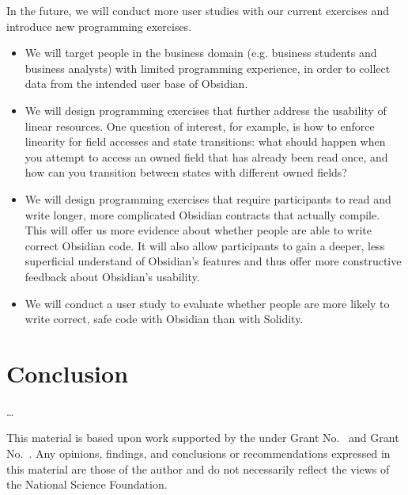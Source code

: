 \documentclass[sigplan,10pt,review]{acmart}\settopmatter{printfolios=true}
\begin{document}
In the future, we will conduct more user studies with our current exercises and introduce new programming
exercises.
\begin{itemize}
\item We will target people in the business domain (e.g. business students and business analysts) with limited
programming experience, in order to collect data from the intended user base of Obsidian.
\item We will design programming exercises that further address the usability of linear resources. One question
of interest, for example, is how to enforce linearity for field accesses and state transitions: what should happen
when you attempt to access an owned field that has already been read once, and how can you transition
between states with different owned fields? 
\item We will design programming exercises that require participants to read and write longer, more complicated 
Obsidian contracts that actually compile. This will offer us more evidence about whether people are able to write 
correct Obsidian code. It will also allow participants to gain a deeper, less superficial understand of Obsidian's 
features and thus offer more constructive feedback about Obsidian's usability. 
\item We will conduct a user study to evaluate whether people are more likely to write correct, safe code with 
Obsidian than with Solidity. 
\end{itemize}

\section{Conclusion}
\ldots

\begin{acks}                            %
  This material is based upon work supported by the
   under Grant
  No.~ and Grant
  No.~.  Any opinions, findings, and
  conclusions or recommendations expressed in this material are those
  of the author and do not necessarily reflect the views of the
  National Science Foundation.
\end{acks}
\end{document}
